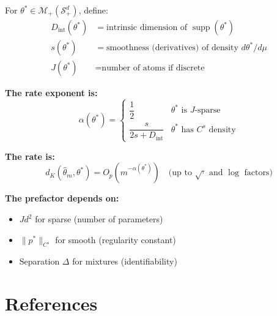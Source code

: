 \documentclass[11pt]{article}
\theoremstyle{definition}
\DeclareMathOperator{\supp}{supp}
\newcommand{\Splus}{\mathcal{S}_+^d}
\newcommand{\M}{\mathcal{M}}
\begin{document}
\begin{tcolorbox}[colback=yellow!10!white, colframe=orange!50!black, title=\textbf{The Universal Rate Formula}]

For $\theta^* \in \M_+(\Splus)$, define:
\begin{align}
    D_{\mathrm{int}}(\theta^*) &= \text{intrinsic dimension of } \supp(\theta^*) \\
    s(\theta^*) &= \text{smoothness (derivatives) of density } d\theta^*/d\mu \\
    J(\theta^*) &= \text{number of atoms if discrete}
\end{align}

\textbf{The rate exponent is:}
\begin{equation}
    \boxed{
    \alpha(\theta^*) = \begin{cases}
        \dfrac{1}{2} & \theta^* \text{ is } J\text{-sparse} \\[1em]
        \dfrac{s}{2s + D_{\mathrm{int}}} & \theta^* \text{ has } C^s \text{ density}
    \end{cases}
    }
\end{equation}

\textbf{The rate is:}
\begin{equation}
    \boxed{
    d_K(\hat{\theta}_m, \theta^*) = O_p\left(m^{-\alpha(\theta^*)}\right) \quad \text{(up to } \sqrt{\cdot} \text{ and } \log \text{ factors)}
    }
\end{equation}

\textbf{The prefactor depends on:}
\begin{itemize}
    \item $J d^2$ for sparse (number of parameters)
    \item $\|p^*\|_{C^s}$ for smooth (regularity constant)
    \item Separation $\Delta$ for mixtures (identifiability)
\end{itemize}
\end{tcolorbox}

\section{References}
\end{document}
